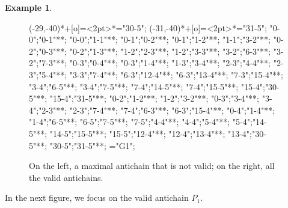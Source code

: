 \documentclass[12pt]{amsart}
\theoremstyle{definition}
\newtheorem{example}{Example}
\begin{document}
\begin{example}
\begin{figure}[H]
{{(-29,-40)*+[o]=<2pt>\hbox{\textbullet}*="30-5";
(-31,-40)*+[o]=<2pt>\hbox{\textbullet}*="31-5";
"0-0";"0-1"**\dir{-};
"0-0";"1-1"**\dir{-};
"0-1";"0-2"**\dir{-};
"0-1";"1-2"**\dir{-};
"1-1";"3-2"**\dir{-};
"0-2";"0-3"**\dir{-};
"0-2";"1-3"**\dir{-};
"1-2";"2-3"**\dir{-};
"1-2";"3-3"**\dir{-};
"3-2";"6-3"**\dir{-};
"3-2";"7-3"**\dir{-};
"0-3";"0-4"**\dir{-};
"0-3";"1-4"**\dir{-};
"1-3";"3-4"**\dir{-};
"2-3";"4-4"**\dir{-};
"2-3";"5-4"**\dir{-};
"3-3";"7-4"**\dir{-};
"6-3";"12-4"**\dir{-};
"6-3";"13-4"**\dir{-};
"7-3";"15-4"**\dir{-};
"3-4";"6-5"**\dir{-};
"3-4";"7-5"**\dir{-};
"7-4";"14-5"**\dir{-};
"7-4";"15-5"**\dir{-};
"15-4";"30-5"**\dir{-};
"15-4";"31-5"**\dir{-};
%
"0-2";"1-2"**;
"1-2";"3-2"**;
"0-3";"3-4"**;
"3-4";"2-3"**;
"2-3";"7-4"**;
"7-4";"6-3"**;
"6-3";"15-4"**;
"0-4";"1-4"**;
"1-4";"6-5"**;
"6-5";"7-5"**;
"7-5";"4-4"**;
"4-4";"5-4"**;
"5-4";"14-5"**;
"14-5";"15-5"**;
"15-5";"12-4"**;
"12-4";"13-4"**;
"13-4";"30-5"**;
"30-5";"31-5"**;
%
\endxy }="G1";
%
%
%
%
\endxy
}
\caption{On the left, a maximal antichain that is not valid; on the right, all the valid antichains.}
\end{figure}
%
%
In the next figure, we focus on the valid antichain $P_1$.
%
%
%
%
\begin{figure}[H]
\centering
{}
\end{figure}
\end{example}
\end{document}
